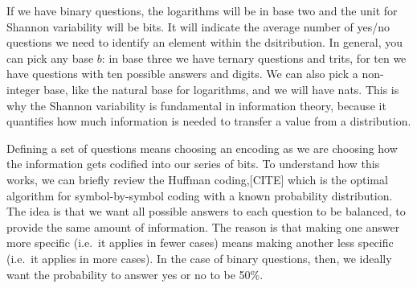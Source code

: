 \documentclass{article}
\begin{document}
If we have binary questions, the logarithms will be in base two and the unit for Shannon variability will be bits. It will indicate the average number of yes/no questions we need to identify an element within the dsitribution. In general, you can pick any base $b$: in base three we have ternary questions and trits, for ten we have questions with ten possible answers and digits. We can also pick a non-integer base, like the natural base for logarithms, and we will have nats. This is why the Shannon variability is fundamental in information theory, because it quantifies how much information is needed to transfer a value from a distribution.

Defining a set of questions means choosing an encoding as we are choosing how the information gets codified into our series of bits. To understand how this works, we can briefly review the Huffman coding,[CITE] which is the optimal algorithm for symbol-by-symbol coding with a known probability distribution. The idea is that we want all possible answers to each question to be balanced, to provide the same amount of information. The reason is that making one answer more specific (i.e.~it applies in fewer cases) means making another less specific (i.e.~it applies in more cases). In the case of binary questions, then, we ideally want the probability to answer yes or no to be 50\%.
\end{document}
